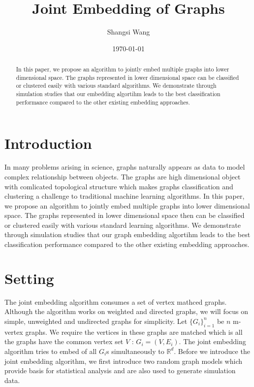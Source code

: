 \documentclass[a4paper]{article}
\title{Joint Embedding of Graphs}
\author{Shangsi Wang}
\date{\today}
\begin{document}
\maketitle

\begin{abstract}
In this paper, we propose an algorithm to jointly embed multiple graphs into lower dimensional space. The graphs represented in lower dimensional space can be classified or clustered easily with various standard algorithms. We demonstrate through simulation studies that our embedding algortihm leads to the best classification performance compared to the other existing embedding approaches. 
\end{abstract}

\section{Introduction}

In many problems arising in science, graphs naturally appears as data to model complex relationship between objects. The graphs are high dimensional object with comlicated topological structure which makes graphs classification and clustering a challenge to traditional machine learning algorithms. In this paper, we propose an algorithm to jointly embed multiple graphs into lower dimensional space. The graphs represented in lower dimensional space then can be classified or clustered easily with various standard learning algorithms. We demonstrate through simulation studies that our graph embedding algortihm leads to the best classification performance compared to the other existing embedding approaches. 

\section{Setting}

The joint embedding algorithm consumes a set of vertex mathced graphs. Although the algorithm works on weighted and directed graphs, we will focus on simple, unweighted and undirected graphs for simplicity. Let $\{G_i \} _{i=1}^{n}$ be $n$ m-vertex graphs. We require the vertices in these graphs are matched which is all the graphs have the common vertex set $V$ : $G_i=(V,E_i)$. The joint embedding algorithm tries to embed of all $G_i$s simultaneously to $\mathbb{R}^d$. Before we introduce the joint embedding algorithm, we first introduce two random graph models which provide basis for statistical analysis and are also used to generate simulation data.
\end{document}
